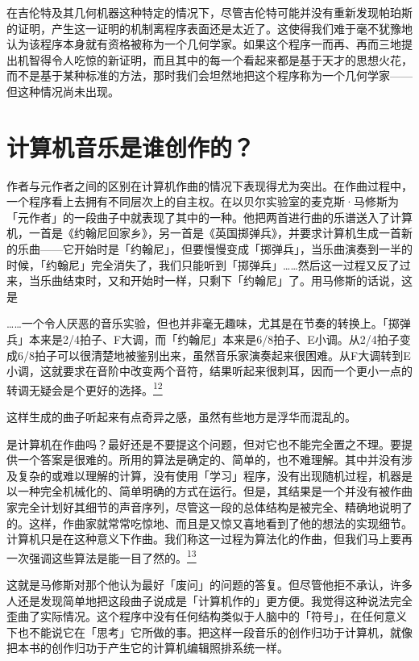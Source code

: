 \documentclass[
  12pt,
  twoside,
  openright,
  oldfontcommands,
]{memoir}
\newenvironment{fsquote}{%
  \begin{mdframed}[style=gebquote]\kaitifamily\small%
}{%
  \end{mdframed}%
}
\begin{document}
在吉伦特及其几何机器这种特定的情况下，尽管吉伦特可能并没有重新发现帕珀斯的证明，产生这一证明的机制离程序表面还是太近了。这使得我们难于毫不犹豫地认为该程序本身就有资格被称为一个几何学家。如果这个程序一而再、再而三地提出机智得令人吃惊的新证明，而且其中的每一个看起来都是基于天才的思想火花，而不是基于某种标准的方法，那时我们会坦然地把这个程序称为一个几何学家------但这种情况尚未出现。

\section{计算机音乐是谁创作的？}

作者与元作者之间的区别在计算机作曲的情况下表现得尤为突出。在作曲过程中，一个程序看上去拥有不同层次上的自主权。在以贝尔实验室的麦克斯·马修斯为「元作者」的一段曲子中就表现了其中的一种。他把两首进行曲的乐谱送入了计算机，一首是《约翰尼回家乡》，另一首是《英国掷弹兵》，并要求计算机生成一首新的乐曲------它开始时是「约翰尼」，但要慢慢变成「掷弹兵」，当乐曲演奏到一半的时候，「约翰尼」完全消失了，我们只能听到「掷弹兵」\ldots\ldots 然后这一过程又反了过来，当乐曲结束时，又和开始时一样，只剩下「约翰尼」了。用马修斯的话说，这是

\ldots\ldots 一个令人厌恶的音乐实验，但也并非毫无趣味，尤其是在节奏的转换上。「掷弹兵」本来是2/4拍子、F大调，而「约翰尼」本来是6/8拍子、E小调。从2/4拍子变成6/8拍子可以很清楚地被鉴别出来，虽然音乐家演奏起来很困难。从F大调转到E小调，这就要求在音阶中改变两个音符，结果听起来很刺耳，因而一个更小一点的转调无疑会是个更好的选择。\hyperref[fn:Chapter18-12]{\textsuperscript{12}}

这样生成的曲子听起来有点奇异之感，虽然有些地方是浮华而混乱的。

\begin{fsquote}
是计算机在作曲吗？最好还是不要提这个问题，但对它也不能完全置之不理。要提供一个答案是很难的。所用的算法是确定的、简单的，也不难理解。其中并没有涉及复杂的或难以理解的计算，没有使用「学习」程序，没有出现随机过程，机器是以一种完全机械化的、简单明确的方式在运行。但是，其结果是一个并没有被作曲家完全计划好其细节的声音序列，尽管这一段的总体结构是被完全、精确地说明了的。这样，作曲家就常常吃惊地、而且是又惊又喜地看到了他的想法的实现细节。计算机只是在这种意义下作曲。我们称这一过程为算法化的作曲，但我们马上要再一次强调这些算法是能一目了然的。\hyperref[fn:Chapter18-13]{\textsuperscript{13}}
\end{fsquote}

这就是马修斯对那个他认为最好「废问」的问题的答复。但尽管他拒不承认，许多人还是发现简单地把这段曲子说成是「计算机作的」更方便。我觉得这种说法完全歪曲了实际情况。这个程序中没有任何结构类似于人脑中的「符号」，在任何意义下也不能说它在「思考」它所做的事。把这样一段音乐的创作归功于计算机，就像把本书的创作归功于产生它的计算机编辑照排系统一样。
\end{document}
